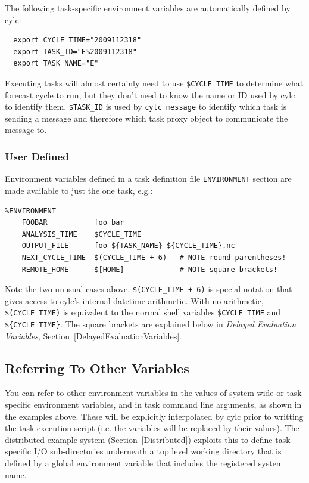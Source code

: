 \documentclass[11pt,a4paper]{article}
\begin{document}
The following task-specific environment variables are automatically
defined by cylc:

\begin{lstlisting}
  export CYCLE_TIME="2009112318"
  export TASK_ID="E%2009112318"
  export TASK_NAME="E"
\end{lstlisting}

Executing tasks will almost certainly need to use
\lstinline=$CYCLE_TIME= to determine what forecast cycle to run,
but they don't need to know the name or ID used by cylc to identify
them. \lstinline=$TASK_ID= is used by \lstinline=cylc message= to 
identify which task is sending a message and therefore which task proxy
object to communicate the message to.


\subsubsection{User Defined}
\label{TaskSpecificVariables}

\lstset{language=cylctaskdef}

Environment variables defined in a task definition file
\lstinline=ENVIRONMENT= section are made available
to just the one task, e.g.:

\begin{lstlisting}
%ENVIRONMENT
    FOOBAR           foo bar
    ANALYSIS_TIME    $CYCLE_TIME
    OUTPUT_FILE      foo-${TASK_NAME}-${CYCLE_TIME}.nc
    NEXT_CYCLE_TIME  $(CYCLE_TIME + 6)   # NOTE round parentheses!
    REMOTE_HOME      $[HOME]             # NOTE square brackets!
\end{lstlisting}

\lstset{language=bash}

Note the two unusual cases above. \lstinline=$(CYCLE_TIME + 6)= is 
special notation that gives access to cylc's internal datetime arithmetic.
With no arithmetic, \lstinline=$(CYCLE_TIME)= is equivalent to 
the normal shell variables \lstinline=$CYCLE_TIME= and
\lstinline=${CYCLE_TIME}=. The square brackets are explained 
below in {\em Delayed Evaluation Variables},
Section~\ref{DelayedEvaluationVariables}.

\subsection{Referring To Other Variables}
\label{ReferringToOtherVariables}

\lstset{language=bash}

You can refer to other environment variables in the values of
system-wide or task-specific environment variables, and in task command
line arguments, as shown in the examples above. These will be explicitly
interpolated by cylc prior to writting the task execution script (i.e.
the variables will be replaced by their values). The distributed example
system (Section~\ref{Distributed}) exploits this to define task-specific
I/O sub-directories underneath a top level working directory that is
defined by a global environment variable that includes the registered
system name.
\end{document}
